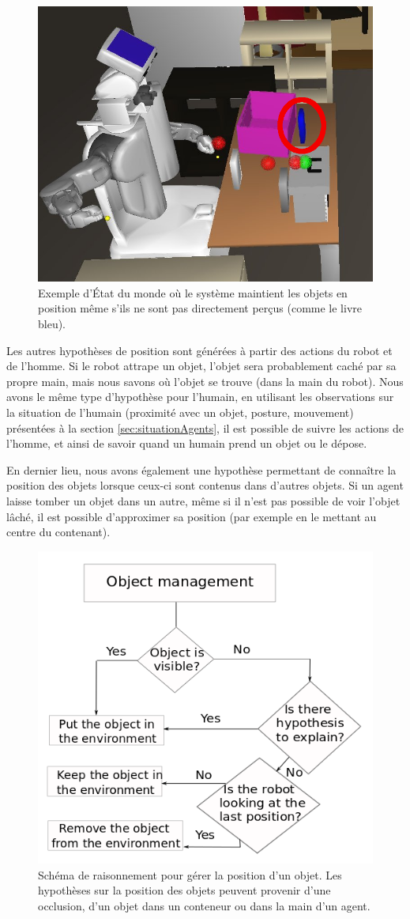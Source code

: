 \documentclass[a4paper,11pt,twoside]{StyleThese}
\begin{document}
\begin{figure}[ht!]
 \centering
  \includegraphics[width=0.69\linewidth]{./img/occluded.png} 
  \caption {Exemple d'État du monde où le système maintient les objets en position même s'ils ne sont pas directement perçus (comme le livre bleu).}
  \label{fig:occluded}
\end{figure}

Les autres hypothèses de position sont générées à partir des actions du robot et de l'homme. Si le robot attrape un objet, l'objet sera probablement caché par sa propre main, mais nous savons où l'objet se trouve (dans la main du robot).
Nous avons le même type d'hypothèse pour l'humain, en utilisant les observations sur la situation de l'humain (proximité avec un objet, posture, mouvement) présentées à la section \ref{sec:situationAgents}, il est possible de suivre les actions de l'homme, et ainsi de savoir quand un humain prend un objet ou le dépose.

En dernier lieu, nous avons également une hypothèse permettant de connaître la position des objets lorsque ceux-ci sont contenus dans d'autres objets.
Si un agent laisse tomber un objet dans un autre, même si il n'est pas possible de voir l'objet lâché, il est possible d'approximer sa position (par exemple en le mettant au centre du contenant).

\begin{figure}[ht!]
 \centering
  \includegraphics[width=0.70\linewidth]{./img/hypothesis.png} 
  \caption {Schéma de raisonnement pour gérer la position d'un objet. Les hypothèses sur la position des objets peuvent provenir d'une occlusion, d'un objet dans un conteneur ou dans la main d'un agent.}
  \label{obj_manag_fg}
\end{figure}
\end{document}
